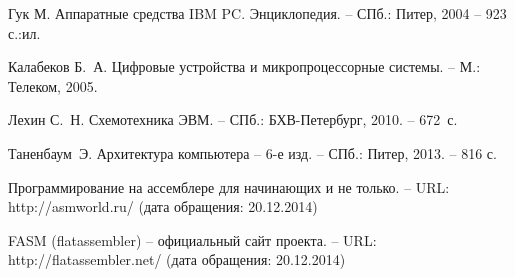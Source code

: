 %
%

\begin{thebibliography}{99}


Гук М. Аппаратные средства IBM PC. Энциклопедия. -- СПб.: Питер, 2004 -- 923 с.:ил.

Калабеков Б.~А. Цифровые устройства и микропроцессорные системы. -- М.: Телеком, 2005.

Лехин С.~Н. Схемотехника ЭВМ. -- СПб.: БХВ-Петербург, 2010. -- 672~с.

Таненбаум~Э. Архитектура компьютера -- 6-е изд. -- СПб.: Питер, 2013. -- 816 с.

Программирование на ассемблере для начинающих и не только. -- URL: http://asmworld.ru/ (дата обращения: 20.12.2014)

FASM (flatassembler) -- официальный сайт проекта. -- URL: http://flatassembler.net/ (дата обращения: 20.12.2014)

\end{thebibliography}